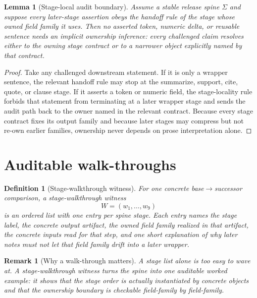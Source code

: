 \documentclass[11pt]{article}
\newtheorem{definition}{Definition}
\newtheorem{lemma}{Lemma}
\newtheorem{remark}{Remark}
\begin{document}
\begin{lemma}[Stage-local audit boundary]
Assume a stable release spine $\Sigma$ and suppose every later-stage assertion obeys the handoff rule of the stage whose owned field family it uses.
Then no asserted token, numeric delta, or reusable sentence needs an implicit ownership inference: every challenged claim resolves either to the owning stage contract or to a narrower object explicitly named by that contract.
\end{lemma}

\begin{proof}
Take any challenged downstream statement.
If it is only a wrapper sentence, the relevant handoff rule may stop at the summarize, support, cite, quote, or clause stage.
If it asserts a token or numeric field, the stage-locality rule forbids that statement from terminating at a later wrapper stage and sends the audit path back to the owner named in the relevant contract.
Because every stage contract fixes its output family and because later stages may compress but not re-own earlier families, ownership never depends on prose interpretation alone.
\end{proof}

\section{Auditable walk-throughs}

\begin{definition}[Stage-walkthrough witness]
For one concrete base$\to$successor comparison, a \emph{stage-walkthrough witness}
\[
W=(w_1,\dots,w_9)
\]
is an ordered list with one entry per spine stage.
Each entry names the stage label, the concrete output artifact, the owned field family realized in that artifact, the concrete inputs read for that step, and one short explanation of why later notes must not let that field family drift into a later wrapper.
\end{definition}

\begin{remark}[Why a walk-through matters]
A stage list alone is too easy to wave at.
A stage-walkthrough witness turns the spine into one auditable worked example: it shows that the stage order is actually instantiated by concrete objects and that the ownership boundary is checkable field-family by field-family.
\end{remark}
\end{document}
